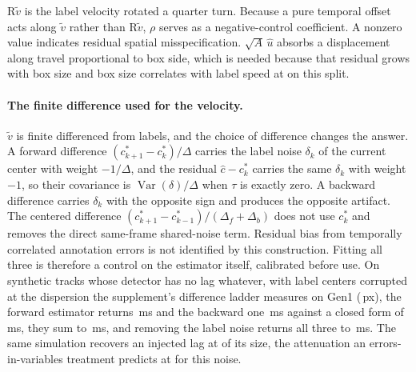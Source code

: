 \documentclass[10pt,twocolumn,letterpaper]{article}
\begin{document}
$\mathrm{R}\tilde v$ is the label velocity rotated a quarter turn. Because a pure
temporal offset acts along $\tilde v$ rather than $\mathrm{R}\tilde v$, $\rho$ serves
as a negative-control coefficient. A nonzero value indicates residual spatial
misspecification.
$\sqrt{A}\,\hat{u}$ absorbs a displacement along travel proportional to box side,
which is needed because that residual grows with box size and box size correlates
with label speed at \outSpeedSizeCorr{} on this split.

\paragraph{The finite difference used for the velocity.}
$\tilde v$ is finite differenced from labels, and the choice of difference changes
the answer. A forward difference $(c^{*}_{k+1}-c^{*}_{k})/\Delta$ carries the
label noise $\delta_{k}$ of the current center with weight $-1/\Delta$, and the
residual $\hat{c}-c^{*}_{k}$ carries the same $\delta_{k}$ with weight $-1$,
so their covariance is $\operatorname{Var}(\delta)/\Delta$ when $\tau$ is exactly
zero. A backward difference carries $\delta_{k}$ with the opposite sign and
produces the opposite artifact. The centered difference
$(c^{*}_{k+1}-c^{*}_{k-1})/(\Delta_{f}+\Delta_{b})$ does not use $c^{*}_{k}$ and
removes the direct same-frame shared-noise term. Residual bias from temporally
correlated annotation errors is not identified by this construction. Fitting all three is therefore a control on the estimator
itself, calibrated before use. On \synTracks{} synthetic tracks whose detector
has no lag whatever, with label centers corrupted at the dispersion the
supplement's difference ladder measures on Gen1 (\,px), the forward
estimator returns \synFwd\,ms and the backward one \synBack\,ms against a closed
form of \synPred\,ms, they sum to \synSum\,ms, and removing the label noise
returns all three to \synZero\,ms. The same simulation recovers an injected lag
at \synRecover{} of its size, the attenuation an errors-in-variables treatment
predicts at \synLambda{} for this noise.
\end{document}
